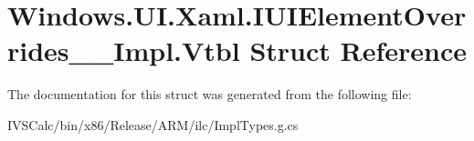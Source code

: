 \hypertarget{struct_windows_1_1_u_i_1_1_xaml_1_1_i_u_i_element_overrides_____impl_1_1_vtbl}{}\section{Windows.\+U\+I.\+Xaml.\+I\+U\+I\+Element\+Overrides\+\_\+\+\_\+\+Impl.\+Vtbl Struct Reference}
\label{struct_windows_1_1_u_i_1_1_xaml_1_1_i_u_i_element_overrides_____impl_1_1_vtbl}


The documentation for this struct was generated from the following file\+:\begin{DoxyCompactItemize}
\item 
I\+V\+S\+Calc/bin/x86/\+Release/\+A\+R\+M/ilc/Impl\+Types.\+g.\+cs\end{DoxyCompactItemize}
